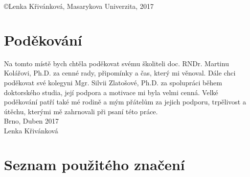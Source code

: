\documentclass[a4paper,12pt]{report}
\theoremstyle{definition} \newtheorem{definice}[veta]{Definice}
\theoremstyle{remark}
\begin{document}
\newpage
\pagestyle{empty}
\null
\vfill
\begin{center}
\copyright \quad Lenka Křivánková, Masarykova Univerzita, 2017
\end{center}

\chapter*{Poděkování}%
\thispagestyle{empty}
\pagestyle{plain}
Na tomto místě bych chtěla poděkovat svému školiteli doc. RNDr. Martinu Kolářovi, Ph.D. za cenné rady, připomínky a čas, který mi věnoval.
Dále chci poděkovat své kolegyni Mgr. Silvii Zlatošové, Ph.D. za spolupráci během doktorského studia, její podpora a motivace mi byla velmi cenná.
Velké poděkování patří také mé rodině a mým přátelům za jejich podporu, trpělivost a útěchu, kterými mě zahrnovali při psaní této práce.
\\

Brno, Duben 2017
\\

Lenka Křivánková



\tableofcontents {}

\chapter*{Seznam použitého značení} 
\end{document}
